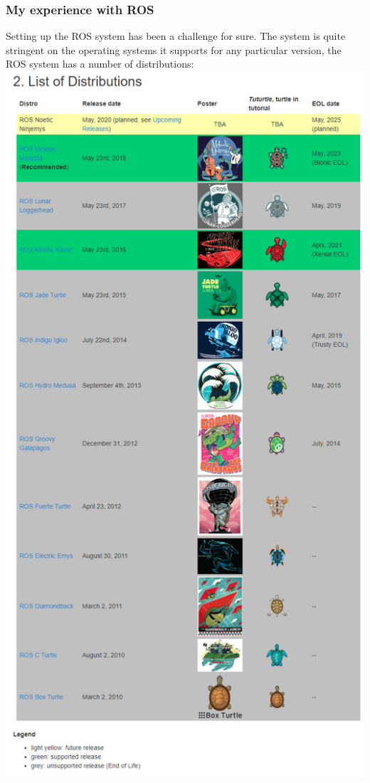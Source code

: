 \documentclass[10pt,a4paper]{report}
\begin{document}
		\subsubsection*{My experience with ROS}
			Setting up the ROS system has been a challenge for sure. The system is quite stringent on the operating systems it supports for any particular version, the ROS system has a number of distributions: \\
			\includegraphics[scale=0.5]{RosDistro}\cite{ros_distros} \\
\end{document}
